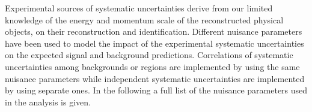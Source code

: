 Experimental sources of systematic uncertainties derive from our limited
knowledge of the energy and momentum scale of the reconstructed physical
objects, on their reconstruction and identification. Different nuisance
parameters have been used to model the impact of the experimental systematic
uncertainties on the expected signal and background predictions. Correlations of
systematic uncertainties among backgrounds or regions are implemented by using
the same nuisance parameters while independent systematic uncertainties are
implemented by using separate ones. In the following a full list of the nuisance
parameters used in the analysis is given.
